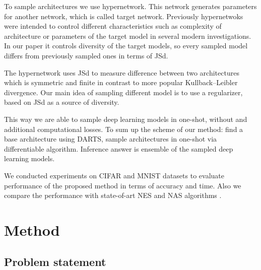 \documentclass{article}
\begin{document}
To sample architectures we use hypernetwork. This network generates parameters for another network, which is called target network.
Previously hypernetwoks were intended to control different characteristics such as
complexity of architecture \citep{darts-cc} or parameters of the target model \citep{cont-learn} in several modern investigations. In our paper it controls 
diversity of the target models, so every sampled model differs from previously sampled ones in terms of JSd.

The hypernetwork uses JSd to measure difference between two architectures which is symmetric and finite
in contrast to more popular Kullback–Leibler divergence. Our main idea of sampling different model is to use a regularizer,
based on JSd as a source of diversity.

This way we are able to sample deep learning models in one-shot, without and additional computational losses.
To sum up the scheme of our method: find a base architecture using DARTS, sample architectures in one-shot via differentiable algorithm. Inference answer is ensemble of the sampled deep learning models.

We conducted experiments on CIFAR and MNIST datasets to evaluate performance of the proposed method in terms of accuracy and time. Also we compare the performance with state-of-art NES and NAS algorithms \citep{darts, ???}.

\section{Method}

\subsection{Problem statement}
\end{document}
